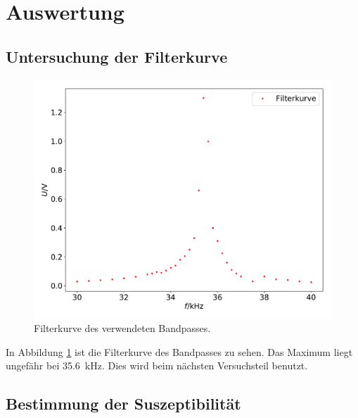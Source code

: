 \section{Auswertung}
\subsection{Untersuchung der Filterkurve}
\begin{figure}
  \centering
  \includegraphics[scale=0.35]{filterkurve.pdf}
  \caption{Filterkurve des verwendeten Bandpasses.}
  \label{fig:1}
\end{figure}
In Abbildung \ref{fig:1} ist die Filterkurve des Bandpasses zu sehen. Das Maximum
liegt ungefähr bei \SI{35.6}{\kilo\hertz}. Dies wird beim nächsten Versuchsteil benutzt.

\subsection{Bestimmung der Suszeptibilität}

